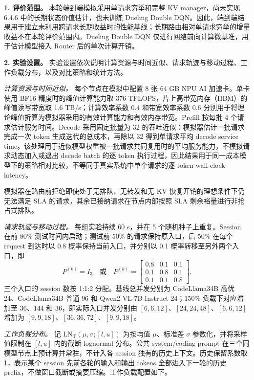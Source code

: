 \medskip
\noindent\textbf{1. 评价范围。}
本轮端到端模拟采用单请求穷举和完整 KV manager，尚未实现 6.4.6 中的长期状态价值估计，也未训练 Dueling Double DQN。因此，端到端结果用于建立未利用跨请求长期收益时的性能基线；长期路由相对单请求穷举的增量收益不在本轮评价范围内。Dueling Double DQN 仅进行网络前向计算微基准，用于估计模型接入 Router 后的单次计算开销。

\medskip
\noindent\textbf{2. 实验设置。}
实验设置依次说明计算资源与时间近似、请求轨迹与移动过程、工作负载分布，以及对比策略和统计方法。

\noindent\textit{计算资源与时间近似。}
每个节点在模拟中配置 8 张 64 GB NPU AI 加速卡。单卡使用 BF16 精度时的峰值计算能力取 376 TFLOPS，片上高带宽内存（HBM）的峰值读写带宽取 1.6 TB/s；计算效率系数 0.4 和带宽效率系数 0.6 分别用于将理论峰值折算为模拟器采用的有效计算能力和有效内存带宽。Prefill 按每批 4 个请求估计服务时间。Decode 采用固定批量为 32 的吞吐近似：模拟器估计一批请求完成一次 token 生成迭代的总成本，再除以 32 得到单请求平均 decode service time。该处理用于近似模型权重被一批请求共同复用时的平均服务能力，不模拟请求动态加入或退出 decode batch 的逐 token 执行过程，因此结果用于同一成本模型下的策略相对比较，不等同于真实系统中单个请求的逐 token wall-clock latency。

模拟器在路由前拒绝即使处于无排队、无转发和无 KV 恢复开销的理想条件下仍无法满足 SLA 的请求，其余已接纳请求在节点内部按照 SLA 剩余裕量进行非抢占式排队。

\noindent\textit{请求轨迹与移动过程。}
每组实验持续 60 s，并在 5 个随机种子上重复。Session 在前 80\% 测试时间内启动；测试前 50\% 的请求保持原入口，后 50\% 在每个 request 到达时以 0.8 概率保持当前入口，并分别以 0.1 概率转移至另外两个入口，即
\[
P^{(k)}=I_3
\quad\mbox{或}\quad
P^{(k)}=
\left[
\begin{array}{ccc}
0.8&0.1&0.1\\
0.1&0.8&0.1\\
0.1&0.1&0.8
\end{array}
\right].
\]
三个入口的 session 数按 1:1:2 分配。基线总并发分别为 CodeLlama34B 高优 24、CodeLlama34B 普通 96 和 Qwen2-VL-7B-Instruct 24；150\% 负载下对应增加至 36、144 和 36，即实际入口并发分别由 \([6,6,12]\)、\([24,24,48]\)、\([6,6,12]\) 增加为 \([9,9,18]\)、\([36,36,72]\)、\([9,9,18]\)。

\noindent\textit{工作负载分布。}
记 \(\mathrm{LN_T}(\mu,\sigma;[l,u])\) 为按均值 \(\mu\)、标准差 \(\sigma\) 参数化，并将采样值限制在 \([l,u]\) 内的截断 lognormal 分布。公共 system/coding prompt 在三个同模型节点上预计算并常驻，不计入各 session 独有的历史上下文。历史保留系数取 1，表示某个 session 先前各轮的输入和输出 tokens 全部进入下一轮的历史 prefix，不做窗口截断或摘要压缩。工作负载配置如下。

